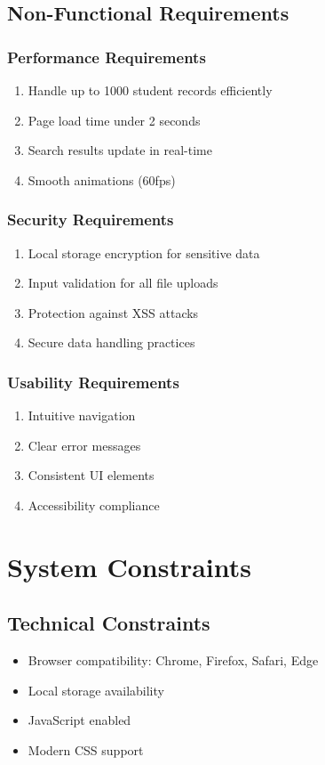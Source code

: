 \documentclass[12pt]{article}
\begin{document}
\subsection{Non-Functional Requirements}

\subsubsection{Performance Requirements}
\begin{enumerate}[label=NFR\arabic*.]
    \item Handle up to 1000 student records efficiently
    \item Page load time under 2 seconds
    \item Search results update in real-time
    \item Smooth animations (60fps)
\end{enumerate}

\subsubsection{Security Requirements}
\begin{enumerate}[label=NFR\arabic*., start=5]
    \item Local storage encryption for sensitive data
    \item Input validation for all file uploads
    \item Protection against XSS attacks
    \item Secure data handling practices
\end{enumerate}

\subsubsection{Usability Requirements}
\begin{enumerate}[label=NFR\arabic*., start=9]
    \item Intuitive navigation
    \item Clear error messages
    \item Consistent UI elements
    \item Accessibility compliance
\end{enumerate}

\section{System Constraints}

\subsection{Technical Constraints}
\begin{itemize}
    \item Browser compatibility: Chrome, Firefox, Safari, Edge
    \item Local storage availability
    \item JavaScript enabled
    \item Modern CSS support
\end{itemize}
\end{document}
